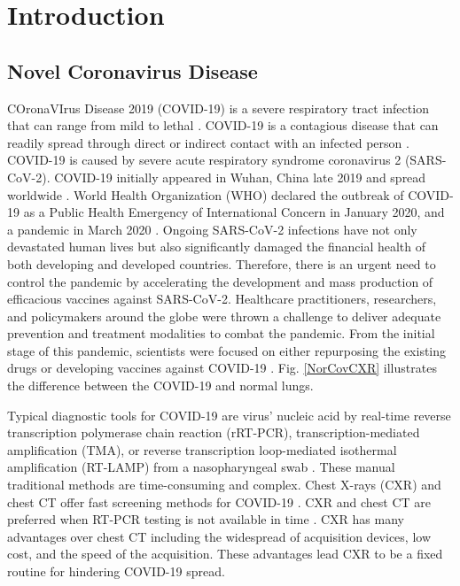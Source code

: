 
\chapter{Introduction} %




\label{chp:intro} %
\section{Novel Coronavirus Disease}

COronaVIrus Disease 2019 (COVID-19) is a severe respiratory tract infection that can range from mild to lethal \cite{acter2020evolution}. COVID-19 is a contagious disease that can readily spread through direct or indirect contact with an infected person \cite{singhal2020review}. COVID-19 is caused by severe acute respiratory syndrome coronavirus 2 (SARS-CoV-2). COVID-19 initially appeared in Wuhan, China late 2019 and spread worldwide \cite{hui2020continuing}. World Health Organization (WHO) declared the outbreak of COVID-19 as a Public Health Emergency of International Concern in January 2020, and a pandemic in March 2020 \cite{platto2020covid19}.
Ongoing SARS-CoV-2 infections have not only devastated human lives but also significantly damaged the financial health of both developing and developed countries. Therefore, there is an urgent need to control the pandemic by accelerating the development and mass production of efficacious vaccines against SARS-CoV-2. Healthcare practitioners, researchers, and policymakers around the globe were thrown a challenge to deliver adequate prevention and treatment modalities to combat the pandemic. From the initial stage of this pandemic, scientists were focused on either repurposing the existing drugs or developing vaccines against COVID-19 \cite{le2020evolution}. Fig. \ref{NorCovCXR} illustrates the difference between the COVID-19 and normal lungs.

Typical diagnostic tools for COVID-19 are virus’ nucleic acid by real-time reverse transcription polymerase chain reaction (rRT-PCR), transcription-mediated amplification (TMA), or reverse transcription loop-mediated isothermal amplification (RT-LAMP) from a nasopharyngeal swab \cite{tahamtan2020real}.  These manual traditional methods are time-consuming and complex. Chest X-rays (CXR) and chest CT offer fast screening methods for COVID-19 \cite{salehi2020coronavirus}\cite{wu2020new}\cite{zu2020coronavirus}. CXR and chest CT are preferred when RT-PCR testing is not available in time \cite{erickson1993advanced}. CXR has many advantages over chest CT including the widespread of acquisition devices, low cost, and the speed of the acquisition\cite{narin2021automatic}\cite{brenner2007computed}\cite{rubin2020role}\cite{shi2020review}. These advantages lead CXR to be a fixed routine for hindering COVID-19 spread. 

